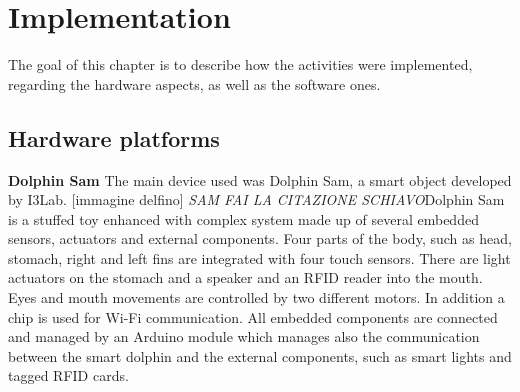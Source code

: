 	\chapter{Implementation}
	The goal of this chapter is to describe how the activities were implemented, regarding the hardware aspects, as well as the software ones.
	\section{Hardware platforms}
	{\textbf{\Large Dolphin Sam}} \newline \newline
	The main device used was Dolphin Sam, a smart object developed by I3Lab.
	[immagine delfino] \newline
	\noindent
	\textit{SAM FAI LA CITAZIONE SCHIAVO}Dolphin Sam is a stuffed toy enhanced with complex system made	up of several embedded sensors, actuators and external components. Four parts of the body, such as head, stomach, right and left fins are integrated with four touch sensors. There are light actuators on the stomach and a speaker and an RFID reader into the mouth. Eyes and mouth movements are controlled by two different motors. In addition a chip is used for Wi-Fi communication. \newline
	All embedded components are connected and managed by an Arduino module which manages also the communication between the smart dolphin and the external components, such as smart lights and tagged RFID cards.
	
	
	
	

		
